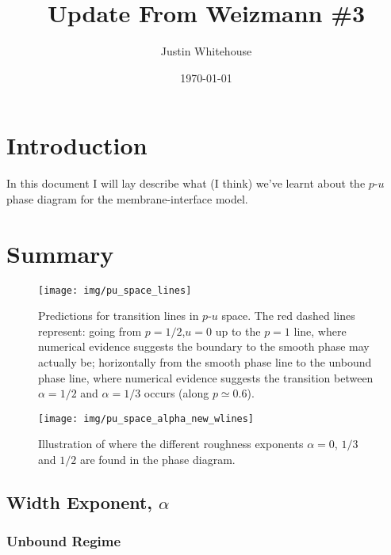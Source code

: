 \documentclass[a4paper,10pt]{article}
\title{Update From Weizmann \#3}
\author{Justin Whitehouse}
\date{\today}
\begin{document}
\maketitle


\tableofcontents
\newpage


\section{Introduction}

In this document I will lay describe what (I think) we've learnt about the $p$-$u$ phase diagram for the membrane-interface model.

\newpage
\section{Summary}

\begin{figure}
 \centering
 \texttt{[image: img/pu\_space\_lines]}
 \caption{Predictions for transition lines in $p$-$u$ space. The red dashed lines represent: going from $p=1/2$,$u=0$ up to the $p=1$ line, where numerical evidence suggests the boundary to the smooth phase may actually be; horizontally from the smooth phase line to the unbound phase line, where numerical evidence suggests the transition between $\alpha=1/2$ and $\alpha=1/3$ occurs (along $p \simeq0.6$).}
 \label{fig:pu_lines}
\end{figure}
\begin{figure}
 \centering
 \texttt{[image: img/pu\_space\_alpha\_new\_wlines]}
 \caption{Illustration of where the different roughness exponents $\alpha=0$, $1/3$ and $1/2$ are found in the phase diagram.}
 \label{fig:pu_alpha_wlines}
\end{figure}

\subsection{Width Exponent, $\alpha$}

\subsubsection{Unbound Regime}
\end{document}
